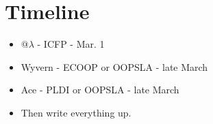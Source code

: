 \section{Timeline}
\begin{itemize}
\item @$\lambda$ - ICFP - Mar. 1
\item Wyvern - ECOOP or OOPSLA - late March
\item Ace - PLDI or OOPSLA - late March
\item Then write everything up.
\end{itemize}
